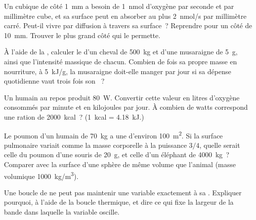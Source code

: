 \begin{exercise}[$\star\star$]\label{exo:b1:organism-environment:5}
Un  cubique de côté \qty{1}{mm} a besoin de \qty{1}{nmol}
d'oxygène par seconde et par millimètre cube, et sa surface peut en
absorber au plus \qty{2}{nmol/s} par millimètre carré. Peut-il vivre par
diffusion à travers sa surface~? Reprendre pour un côté de \qty{10}{mm}.
Trouver le plus grand côté qui le permette.
\end{exercise}

\begin{exercise}[$\star\star$]\label{exo:b1:organism-environment:6}
À l'aide de la , calculer le  d'un cheval
de \qty{500}{kg} et d'une musaraigne de \qty{5}{g}, ainsi que
l'intensité massique de chacun. Combien de fois sa propre masse en
nourriture, à \qty{5}{kJ/g}, la musaraigne doit-elle manger par jour si
sa dépense quotidienne vaut trois fois son ~?
\end{exercise}

\begin{exercise}[$\star\star$]\label{exo:b1:organism-environment:7}
Un humain au repos produit \qty{80}{W}. Convertir cette valeur en litres
d'oxygène consommés par minute et en kilojoules par jour. À combien de
watts correspond une ration de \qty{2000}{kcal}~?
(\qty{1}{kcal} = \qty{4.18}{kJ}.)
\end{exercise}

\begin{exercise}[$\star\star$]\label{exo:b1:organism-environment:8}
Le poumon d'un humain de \qty{70}{kg} a une  d'environ
\qty{100}{m^2}. Si la surface pulmonaire variait comme la masse
corporelle à la puissance $3/4$, quelle serait celle du poumon d'une
souris de \qty{20}{g}, et celle d'un éléphant de \qty{4000}{kg}~?
Comparer avec la surface d'une sphère de même volume que l'animal
(masse volumique \qty{1000}{kg/m^3}).
\end{exercise}

\begin{exercise}[$\star\star$]\label{exo:b1:organism-environment:9}
Une boucle de  ne peut pas maintenir une variable
exactement à sa . Expliquer pourquoi, à l'aide de la
boucle thermique, et dire ce qui fixe la largeur de la bande dans
laquelle la variable oscille.
\end{exercise}

